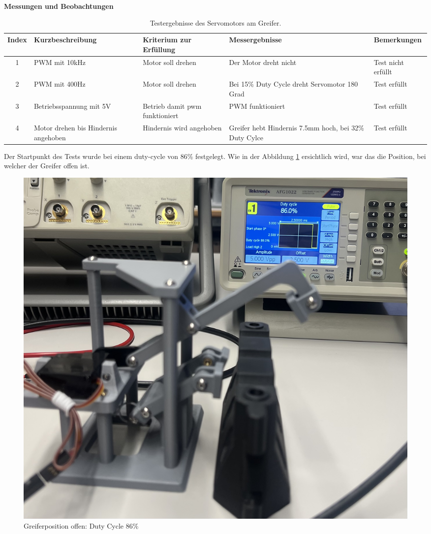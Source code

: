 \textbf{Messungen und Beobachtungen}

\begin{table}[H]
\centering
\small
\begin{tabularx}{\textwidth}{|c|X|X|X|l|}
        \hline
        \textbf{Index} & \textbf{Kurzbeschreibung} & \textbf{Kriterium zur Erfüllung} & \textbf{Messergebnisse} & \textbf{Bemerkungen} \\
        \hline
        1 & PWM mit 10kHz & Motor soll drehen & Der Motor dreht nicht & Test nicht erfüllt \\ \hline
        2 & PWM mit 400Hz & Motor soll drehen & Bei 15\% Duty Cycle dreht Servomotor 180 Grad & Test erfüllt \\ \hline
        3 & Betriebsspannung mit 5V & Betrieb damit \acrshort{pwm} funktioniert  & PWM funktioniert & Test erfüllt\\ \hline
        4 & Motor drehen bis Hindernis angehoben & Hindernis wird angehoben & Greifer hebt Hindernis 7.5mm hoch, bei 32\% Duty Cylce & Test erfüllt \\ \hline
\end{tabularx}
    \caption{Testergebnisse des Servomotors am Greifer.}
\label{tab:testpunkte Servomotor}
\end{table}

\newpage

Der Startpunkt des Tests wurde bei einem \gls{duty-cycle} von 86\% festgelegt. Wie in der Abbildung \ref{fig: Greiferposition offen: Duty Cycle 86} ersichtlich wird, war das die Position, bei welcher der Greifer offen ist.

\begin{figure}[H]
    \centering
    \includegraphics[width=0.8\linewidth]{img/ServoGreifferoffen.jpeg}
    \caption{Greiferposition offen: Duty Cycle 86\%}
    \label{fig: Greiferposition offen: Duty Cycle 86}
\end{figure}

